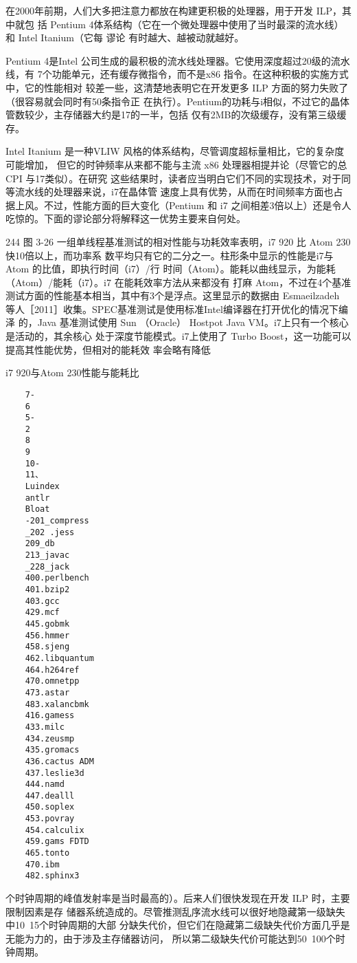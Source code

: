 在2000年前期，人们大多把注意力都放在构建更积极的处理器，用于开发 ILP，其中就包
括 Pentium 4体系结构（它在一个微处理器中使用了当时最深的流水线）和 Intel Itanium（它每
谬论 有时越大、越被动就越好。

Pentium 4是Intel 公司生成的最积极的流水线处理器。它使用深度超过20级的流水线，有
7个功能单元，还有缓存微指令，而不是x86 指令。在这种积极的实施方式中，它的性能相对
较差一些，这清楚地表明它在开发更多 ILP 方面的努力失败了（很容易就会同时有50条指令正
在执行）。Pentium的功耗与i相似，不过它的晶体管数较少，主存储器大约是17的一半，包括
仅有2MB的次级缓存，没有第三级缓存。

Intel Itanium 是一种VLIW 风格的体系结构，尽管调度超标量相比，它的复杂度可能增加，
但它的时钟频率从来都不能与主流 x86 处理器相提并论（尽管它的总CPI 与17类似）。在研究
这些结果时，读者应当明白它们不同的实现技术，对于同等流水线的处理器来说，i7在晶体管
速度上具有优势，从而在时间频率方面也占据上风。不过，性能方面的巨大变化（Pentium 和 i7
之间相差3倍以上）还是令人吃惊的。下面的谬论部分将解释这一优势主要来自何处。

244
图 3-26
一组单线程基准测试的相对性能与功耗效率表明，i7 920 比 Atom 230快10倍以上，而功率系
数平均只有它的二分之一。柱形条中显示的性能是i7与 Atom 的比值，即执行时间（i7）/行
时间（Atom）。能耗以曲线显示，为能耗（Atom）/能耗（i7）。i7 在能耗效率方法从来都没有
打麻 Atom，不过在4个基准测试方面的性能基本相当，其中有3个是浮点。这里显示的数据由
Esmaeilzadeh 等人［2011］收集。SPEC基准测试是使用标准Intel编译器在打开优化的情况下编泽
的，Java 基准测试使用 Sun （Oracle） Hostpot Java VM。i7上只有一个核心是活动的，其余核心
处于深度节能模式。i7上使用了 Turbo Boost，这一功能可以提高其性能优势，但相对的能耗效
率会略有降低

i7 920与Atom 230性能与能耗比
\begin{verbatim}
    7-
    6
    5-
    2
    8
    9
    10-
    11、
    Luindex
    antlr
    Bloat
    -201_compress
    _202 .jess
    209_db
    213_javac
    _228_jack
    400.perlbench
    401.bzip2
    403.gcc
    429.mcf
    445.gobmk
    456.hmmer
    458.sjeng
    462.libquantum
    464.h264ref
    470.omnetpp
    473.astar
    483.xalancbmk
    416.gamess
    433.milc
    434.zeusmp
    435.gromacs
    436.cactus ADM
    437.leslie3d
    444.namd
    447.dealll
    450.soplex
    453.povray
    454.calculix
    459.gams FDTD
    465.tonto
    470.ibm
    482.sphinx3
\end{verbatim}
个时钟周期的峰值发射率是当时最高的）。后来人们很快发现在开发 ILP 时，主要限制因素是存
储器系统造成的。尽管推测乱序流水线可以很好地隐藏第一级缺失中10~15个时钟周期的大部
分缺失代价，但它们在隐藏第二级缺失代价方面几乎是无能为力的，由于涉及主存储器访问，
所以第二级缺失代价可能达到50~100个时钟周期。

